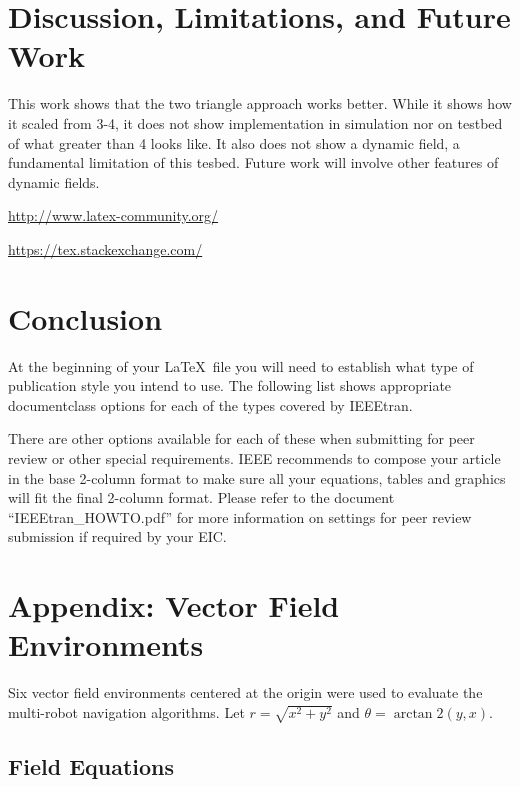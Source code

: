 \documentclass[lettersize,journal]{IEEEtran}
\begin{document}
\section{Discussion, Limitations, and Future Work}


This work shows that the two triangle approach works better.
While it shows how it scaled from 3-4, it does not show implementation in simulation nor on testbed of what greater than 4 looks like.
It also does not show a dynamic field, a fundamental limitation of this tesbed.
Future work will involve other features of dynamic fields.


\begin{list}{}{}
\item{\url{http://www.latex-community.org/}} 
\item{\url{https://tex.stackexchange.com/} }
\end{list}



\section{Conclusion}
\noindent At the beginning of your \LaTeX\ file you will need to establish what type of publication style you intend to use. The following list shows appropriate documentclass options for each of the types covered by IEEEtran.


There are other options available for each of these when submitting for peer review or other special requirements. IEEE recommends to compose your article in the base 2-column format to make sure all your equations, tables and graphics will fit the final 2-column format. Please refer to the document ``IEEEtran\_HOWTO.pdf'' for more information on settings for peer review submission if required by your EIC.



\section{Appendix: Vector Field Environments}
\label{sec:appendix_vector_fields}

Six vector field environments centered at the origin were used to evaluate the multi-robot navigation algorithms. Let $r = \sqrt{x^2 + y^2}$ and $\theta = \arctan2(y, x)$.

\subsection{Field Equations}
\end{document}
